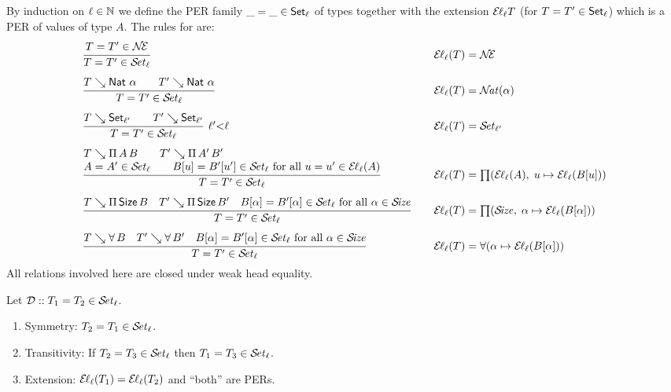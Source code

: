 \documentclass[acmlarge,review,anonymous]{acmart}\settopmatter{printfolios=true}
\newcommand{\LONGVERSION}[1]{}
\begin{document}
By induction on $\ell \in \NN$ we define the PER family
$\_ = \_ \in \Set[\ell]$ of types
together with the extension $\EL[\ell] T$ (for $T = T' \in \Set[\ell]$)
which is a PER of values of type $A$.
The rules for  are:
\[
\begin{array}{l@{\qquad}l}
  \ru{%
      T = T' \in \NEE
    }{T = T' \in \SET[\ell]}
  & \EL[\ell](T) = \NEE
\\[3ex]
  \ru{T \evalsto \Nat\,\alpha \qquad T' \evalsto \Nat\,\alpha
    }{T = T' \in \SET[\ell]}
  & \EL[\ell](T) = \NAT(\alpha)
\\[3ex]
  \rux{T \evalsto \Set[\ell'] \qquad T' \evalsto \Set[\ell']
     }{T = T' \in \SET[\ell]
     }{\ell'{<}\ell}
  & \EL[\ell](T) = \SET[\ell']
\\[3ex]
  \rul{T \evalsto \piT A B \qquad
      T' \evalsto \piT{A'}{B'} \\
      A = A' \in \SET[\ell] \qquad
      B[u] = B'[u'] \in \SET[\ell] \mforall u = u' \in \EL[\ell](A)
    }{T = T' \in \SET[\ell]}
  & \EL[\ell](T) = \PI(\EL[\ell](A),\;u \mapsto \EL[\ell](B[u]))
\\[3ex]
  \rul{T \evalsto \piT \Size B \quad
      T' \evalsto \piT{\Size}{B'} \quad
      B[\alpha] = B'[\alpha] \in \SET[\ell] \mforall \alpha \in \SIZE
    }{T = T' \in \SET[\ell]}
  & \EL[\ell](T) = \PI(\SIZE,\; \alpha \mapsto \EL[\ell](B[\alpha]))
\\[3ex]
  \rul{T \evalsto \forallT B \quad
      T' \evalsto \forallT{B'} \quad
      B[\alpha] = B'[\alpha] \in \SET[\ell] \mforall \alpha \in \SIZE
    }{T = T' \in \SET[\ell]}
  & \EL[\ell](T) = \FORALL(\alpha \mapsto \EL[\ell](B[\alpha]))
\end{array}
\]
All relations involved here are closed under weak head equality.
\begin{lemma}
  Let $\DD :: T_1 = T_2 \in \SET[\ell]$.
  \begin{enumerate}
  \item Symmetry: $T_2 = T_1 \in \SET[\ell]$.
  \item Transitivity: If\/ $T_2 = T_3 \in \SET[\ell]$ then $T_1 = T_3 \in \SET[\ell]$.
  \item Extension: $\EL[\ell](T_1) = \EL[\ell](T_2)$ and ``both'' are PERs.
  \end{enumerate}
\end{lemma}
\LONGVERSION{
\begin{proof}
  Simultaneously by induction on $\DD$.
\end{proof}
}
\end{document}
